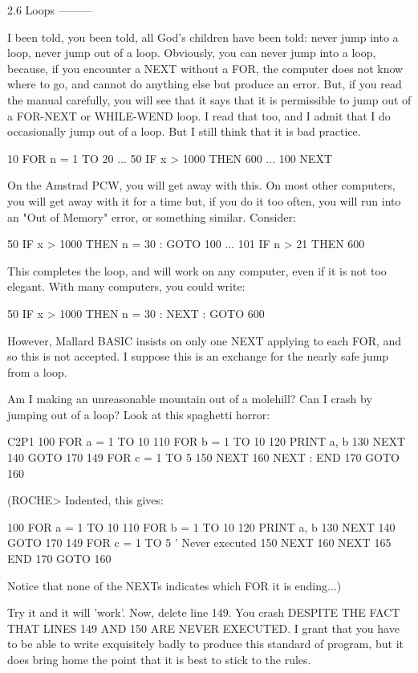 2.6 Loops
---------

I been told, you been told, all God's children have been told: never jump into 
a  loop, never jump out of a loop. Obviously, you can never jump into a  loop, 
because,  if  you encounter a NEXT without a FOR, the computer does  not  know 
where  to  go, and cannot do anything else but produce an error. But,  if  you 
read the manual carefully, you will see that it says that it is permissible to 
jump out of a FOR-NEXT or WHILE-WEND loop. I read that too, and I admit that I 
do occasionally jump out of a loop. But I still think that it is bad practice.

        10 FOR n = 1 TO 20
        ...
        50     IF x > 1000 THEN 600
        ...
        100 NEXT

On the Amstrad PCW, you will get away with this. On most other computers,  you 
will  get  away with it for a time but, if you do it too often, you  will  run 
into an "Out of Memory" error, or something similar. Consider:

        50     IF x > 1000 THEN n = 30 : GOTO 100
        ...
        101 IF n > 21 THEN 600

This completes the loop, and will work on any computer, even if it is not  too 
elegant. With many computers, you could write:

        50 IF x > 1000 THEN n = 30 : NEXT : GOTO 600

However,  Mallard BASIC insists on only one NEXT applying to each FOR, and  so 
this  is not accepted. I suppose this is an exchange for the nearly safe  jump 
from a loop.

Am I making an unreasonable mountain out of a molehill? Can I crash by jumping 
out of a loop? Look at this spaghetti horror:

        C2P1
        100 FOR a = 1 TO 10
        110 FOR b = 1 TO 10
        120 PRINT a, b
        130 NEXT
        140 GOTO 170
        149 FOR c = 1 TO 5
        150 NEXT
        160 NEXT : END
        170 GOTO 160

(ROCHE> Indented, this gives:

        100 FOR a = 1 TO 10
        110     FOR b = 1 TO 10
        120         PRINT a, b
        130     NEXT
        140     GOTO 170
        149     FOR c = 1 TO 5  ' Never executed
        150     NEXT
        160 NEXT
        165 END
        170 GOTO 160

Notice that none of the NEXTs indicates which FOR it is ending...)

Try  it and it will 'work'. Now, delete line 149. You crash DESPITE  THE  FACT 
THAT LINES 149 AND 150 ARE NEVER EXECUTED. I grant that you have to be able to 
write exquisitely badly to produce this standard of program, but it does bring 
home the point that it is best to stick to the rules.


